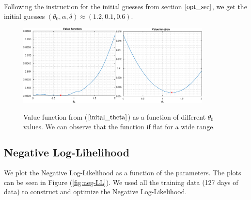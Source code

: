 \documentclass[11pt]{article}
\theoremstyle{definition}
\begin{document}
Following the instruction for the initial guesses from section $\ref{opt_sec}$, we get the initial guesses $(\theta_0,\alpha,\delta)\approx(1.2,0.1,0.6)$.

\begin{figure}[H]
\centering
\includegraphics[width=0.45\textwidth]{plots/initial_guess/initial_theta_1.eps}\quad\includegraphics[width=0.42\textwidth]{plots/initial_guess/initial_theta_2.eps}
\caption{Value function from ($\ref{inital_theta}$) as a function of different $\theta_0$ values. We can observe that the function if flat for a wide range.}
\end{figure}

\subsection{Negative Log-Lihelihood}

We plot the Negative Log-Likelihood as a function of the parameters. The plots can be seen in Figure (\ref{fig:neg-LL}). We used all the training data (127 days of data) to construct and optimize the Negative Log-Likelihood.
\end{document}
